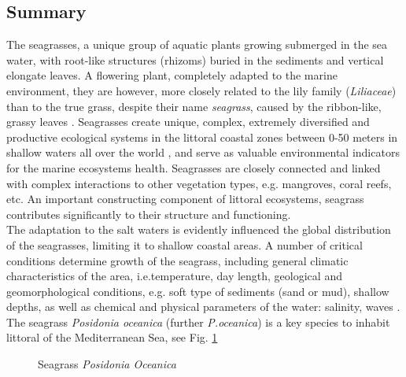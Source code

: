 \documentclass[11pt]{article}
\begin{document}
\subsection{Summary}
The seagrasses, a unique group of aquatic plants growing submerged in the sea water, with root-like
structures (rhizoms) buried in the sediments and vertical elongate leaves. A flowering plant,
completely adapted to the marine environment, they are however, more closely related to the lily family
(\textit{Liliaceae}) than to the true grass, despite their name \textit{seagrass}, caused by the ribbon-like, grassy leaves
\cite{McKenzie08}\label{McKenzie08}. Seagrasses create unique, complex, extremely diversified and productive ecological systems in the
littoral coastal zones between 0-50 meters in shallow waters all over the world \cite{Hogarth07}\label{Hogarth07}, and
serve as valuable environmental indicators for the marine ecosystems health. Seagrasses are closely
connected and linked with complex interactions to other vegetation types, e.g. mangroves, coral reefs,
etc. An important constructing component of littoral ecosystems, seagrass contributes significantly to
their structure and functioning.\\
The adaptation to the salt waters is evidently influenced the global distribution of the seagrasses,
limiting it to shallow coastal areas. A number of critical conditions determine growth of the seagrass,
including general climatic characteristics of the area, i.e.temperature, day length, geological and
geomorphological conditions, e.g. soft type of sediments (sand or mud), shallow depths, as well as
chemical and physical parameters of the water: salinity, waves \cite{McKenzie02}\label{McKenzie02}.
The seagrass \textit{Posidonia oceanica} (further \textit{P.oceanica}) is a key species to inhabit littoral of the
Mediterranean Sea, see Fig. \ref{fig:1}

\begin{figure}[h]
	\centering
	\hspace{2mm}
	\caption{Seagrass \textit{Posidonia Oceanica}}
	\label{fig:1}
\end{figure}
\end{document}
